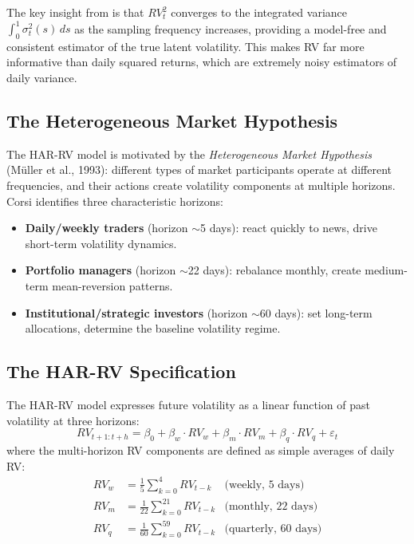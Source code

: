 \documentclass[11pt,a4paper]{article}
\begin{document}
The key insight from \citet{andersen2003} is that $RV_t^2$ converges to the integrated variance $\int_0^1 \sigma_t^2(s) \, ds$ as the sampling frequency increases, providing a model-free and consistent estimator of the true latent volatility. This makes RV far more informative than daily squared returns, which are extremely noisy estimators of daily variance.

\subsection{The Heterogeneous Market Hypothesis}

The HAR-RV model is motivated by the \textit{Heterogeneous Market Hypothesis} (M\"uller et al., 1993): different types of market participants operate at different frequencies, and their actions create volatility components at multiple horizons. Corsi identifies three characteristic horizons:

\begin{itemize}
    \item \textbf{Daily/weekly traders} (horizon $\sim$5 days): react quickly to news, drive short-term volatility dynamics.
    \item \textbf{Portfolio managers} (horizon $\sim$22 days): rebalance monthly, create medium-term mean-reversion patterns.
    \item \textbf{Institutional/strategic investors} (horizon $\sim$60 days): set long-term allocations, determine the baseline volatility regime.
\end{itemize}

\subsection{The HAR-RV Specification}

The HAR-RV model expresses future volatility as a linear function of past volatility at three horizons:
\begin{equation}
    RV_{t+1:t+h} = \beta_0 + \beta_w \cdot RV_w + \beta_m \cdot RV_m + \beta_q \cdot RV_q + \varepsilon_t
    \label{eq:har}
\end{equation}
where the multi-horizon RV components are defined as simple averages of daily RV:
\begin{align}
    RV_w &= \frac{1}{5}\sum_{k=0}^{4} RV_{t-k}  & \text{(weekly, 5 days)} \\
    RV_m &= \frac{1}{22}\sum_{k=0}^{21} RV_{t-k} & \text{(monthly, 22 days)} \\
    RV_q &= \frac{1}{60}\sum_{k=0}^{59} RV_{t-k} & \text{(quarterly, 60 days)}
\end{align}
\end{document}
